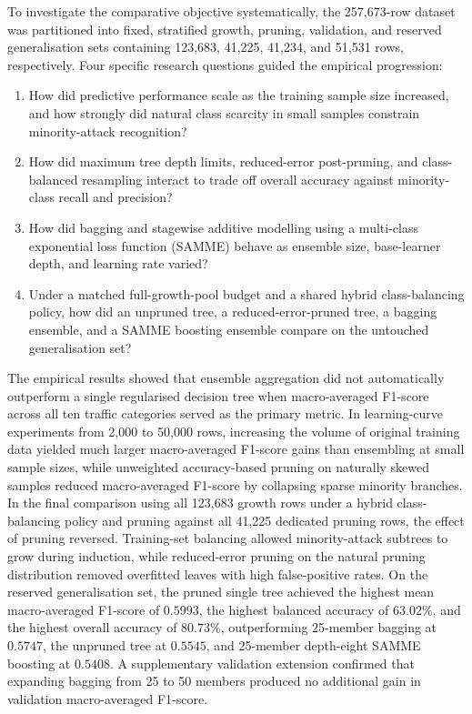To investigate the comparative objective systematically, the 257,673-row dataset was partitioned into fixed, stratified growth, pruning, validation, and reserved generalisation sets containing 123,683, 41,225, 41,234, and 51,531 rows, respectively. Four specific research questions guided the empirical progression:
\begin{enumerate}
    \item How did predictive performance scale as the training sample size increased, and how strongly did natural class scarcity in small samples constrain minority-attack recognition?
    \item How did maximum tree depth limits, reduced-error post-pruning, and class-balanced resampling interact to trade off overall accuracy against minority-class recall and precision?
    \item How did bagging and stagewise additive modelling using a multi-class exponential loss function (SAMME) behave as ensemble size, base-learner depth, and learning rate varied?
    \item Under a matched full-growth-pool budget and a shared hybrid class-balancing policy, how did an unpruned tree, a reduced-error-pruned tree, a bagging ensemble, and a SAMME boosting ensemble compare on the untouched generalisation set?
\end{enumerate}

The empirical results showed that ensemble aggregation did not automatically outperform a single regularised decision tree when macro-averaged F1-score across all ten traffic categories served as the primary metric. In learning-curve experiments from 2,000 to 50,000 rows, increasing the volume of original training data yielded much larger macro-averaged F1-score gains than ensembling at small sample sizes, while unweighted accuracy-based pruning on naturally skewed samples reduced macro-averaged F1-score by collapsing sparse minority branches. In the final comparison using all 123,683 growth rows under a hybrid class-balancing policy and pruning against all 41,225 dedicated pruning rows, the effect of pruning reversed. Training-set balancing allowed minority-attack subtrees to grow during induction, while reduced-error pruning on the natural pruning distribution removed overfitted leaves with high false-positive rates. On the reserved generalisation set, the pruned single tree achieved the highest mean macro-averaged F1-score of $0.5993$, the highest balanced accuracy of $63.02\%$, and the highest overall accuracy of $80.73\%$, outperforming 25-member bagging at $0.5747$, the unpruned tree at $0.5545$, and 25-member depth-eight SAMME boosting at $0.5408$. A supplementary validation extension confirmed that expanding bagging from 25 to 50 members produced no additional gain in validation macro-averaged F1-score.


